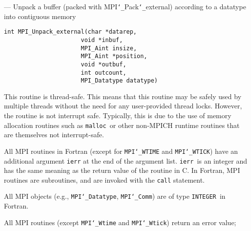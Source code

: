\startmanpage
{}
--- Unpack a buffer (packed with MPI{\tt \char`\_}Pack{\tt \char`\_}external)  according to a datatype into contiguous memory 
\startvb\begin{verbatim}
int MPI_Unpack_external(char *datarep,
                      void *inbuf,
                      MPI_Aint insize,
                      MPI_Aint *position,
                      void *outbuf,
                      int outcount,
                      MPI_Datatype datatype)

\end{verbatim}
\endvb

\par
{}
\par
{}
\par
{}
\par
This routine is thread-safe.  This means that this routine may be
safely used by multiple threads without the need for any user-provided
thread locks.  However, the routine is not interrupt safe.  Typically,
this is due to the use of memory allocation routines such as {\tt malloc
}or other non-MPICH runtime routines that are themselves not interrupt-safe.
\par
{}
All MPI routines in Fortran (except for {\tt MPI{\tt \char`\_}WTIME} and {\tt MPI{\tt \char`\_}WTICK}) have
an additional argument {\tt ierr} at the end of the argument list.  {\tt ierr
}is an integer and has the same meaning as the return value of the routine
in C.  In Fortran, MPI routines are subroutines, and are invoked with the
{\tt call} statement.
\par
All MPI objects (e.g., {\tt MPI{\tt \char`\_}Datatype}, {\tt MPI{\tt \char`\_}Comm}) are of type {\tt INTEGER
}in Fortran.
\par
{}
\par
All MPI routines (except {\tt MPI{\tt \char`\_}Wtime} and {\tt MPI{\tt \char`\_}Wtick}) return an error value;
